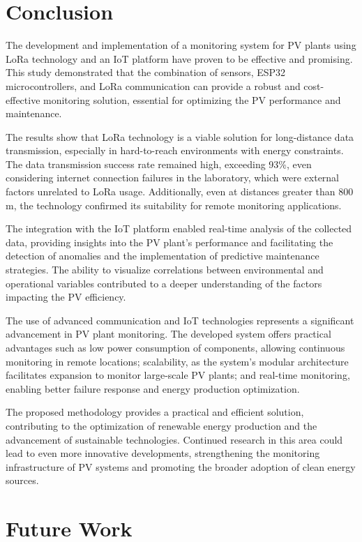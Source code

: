 \documentclass{ieeeaccess}
\begin{document}
\section{Conclusion}
\label{sec:conc}

The development and implementation of a monitoring system for PV plants using LoRa technology  and an IoT platform have proven to be effective and promising. This study demonstrated that the combination of sensors, ESP32 microcontrollers, and LoRa communication can provide a robust and cost-effective monitoring solution, essential for optimizing the PV performance and maintenance.

The results show that LoRa technology is a viable solution for long-distance data transmission, especially in hard-to-reach environments with energy constraints. The data transmission success rate remained high, exceeding 93\%, even considering internet connection failures in the laboratory, which were external factors unrelated to LoRa usage. Additionally, even at distances greater than 800 m, the technology confirmed its suitability for remote monitoring applications.

The integration with the IoT platform enabled real-time analysis of the collected data, providing insights into the PV plant’s performance  and facilitating the detection of anomalies and the implementation of predictive maintenance strategies. The ability to visualize correlations between environmental and operational variables contributed to a deeper understanding of the factors impacting the PV efficiency.

The use of advanced communication and IoT technologies represents a significant advancement in PV plant monitoring. The developed system offers practical advantages such as low power consumption of components, allowing continuous monitoring in remote locations; scalability, as the system's modular architecture facilitates expansion to monitor large-scale PV plants; and real-time monitoring, enabling better failure response and energy production optimization.

The proposed methodology provides a practical and efficient solution, contributing to the optimization of renewable energy production and the advancement of sustainable technologies. Continued research in this area could lead to even more innovative developments, strengthening the monitoring infrastructure of PV systems and promoting the broader adoption of clean energy sources.


\section{Future Work}
\label{sec:future}
\end{document}
